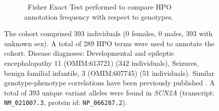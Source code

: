 \begin{figure}[htbp]
\begin{subfigure}[b]{0.95\textwidth}
\end{subfigure}
\vspace{2em}
\begin{subfigure}[b]{0.95\textwidth}
\centering
{}
\captionsetup{justification=raggedright,singlelinecheck=false}
\caption{ Fisher Exact Test performed to compare HPO annotation frequency with respect to genotypes. }
\end{subfigure}

\vspace{2em}

\caption{ The cohort comprised 393 individuals (0 females, 0 males, 393 with unknown sex). A total of 289 HPO terms were used to annotate the cohort. Disease diagnoses: Developmental and epileptic encephalopathy 11 (OMIM:613721) (342 individuals), Seizures, benign familial infantile, 3 (OMIM:607745) (51 individuals). Similar genotype-phenotype correlations have been previously published \cite{PMID_31904126}. A total of 393 unique variant alleles were found in \textit{SCN2A} (transcript: \texttt{NM\_021007.3}, protein id: \texttt{NP\_066287.2}).}
\end{figure}
